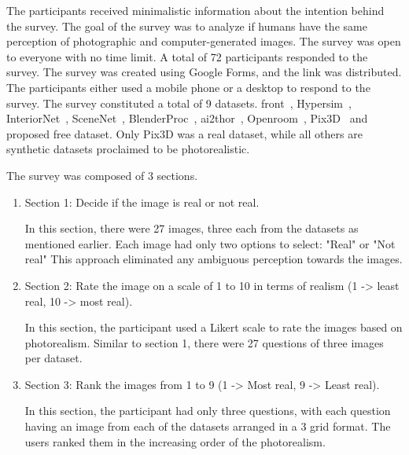 The participants received minimalistic information about the intention behind the survey.
The goal of the survey was to analyze if humans have the same perception of photographic and computer-generated images.
The survey was open to everyone with no time limit.
A total of 72 participants responded to the survey.
The survey was created using Google Forms, and the link was distributed.
The participants either used a mobile phone or a desktop to respond to the survey.
The survey constituted a total of 9 datasets.
\gls{front}~\cite{Fu20203DFRONT3F}, Hypersim~\cite{Roberts2020HypersimAP}, InteriorNet~\cite{InteriorNet18}, SceneNet~\cite{McCormac2017}, BlenderProc~\cite{dlr139317},
\gls{ai2thor}~\cite{ai2thor}, Openroom~\cite{Li_2021_CVPR}, Pix3D~\cite{Sun2018} and proposed \gls{free} dataset.
Only Pix3D was a real dataset, while all others are synthetic datasets proclaimed to be photorealistic.

The survey was composed of 3 sections.
\begin{enumerate}
    \item Section 1: Decide if the image is real or not real.

    In this section, there were 27 images, three each from the datasets as mentioned earlier.
    Each image had only two options to select: "Real" or "Not real"
    This approach eliminated any ambiguous perception towards the images.

    \item Section 2: Rate the image on a scale of 1 to 10 in terms of realism (1 -> least real, 10 -> most real).

    In this section, the participant used a Likert scale to rate the images based on photorealism.
    Similar to section 1, there were 27 questions of three images per dataset.

    \item Section 3: Rank the images from 1 to 9 (1 -> Most real, 9 -> Least real).

    In this section, the participant had only three questions, with each question having an image from each of the datasets arranged in a 3 grid format.
    The users ranked them in the increasing order of the photorealism.
\end{enumerate}



